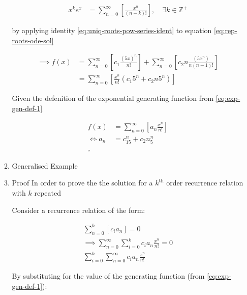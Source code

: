 \documentclass[11pt]{article}
\begin{document}
\begin{enumerate}
\begin{enumerate}
\begin{align}
    x^ke^x &= \sum^{\infty}_{n= 0}   {\left[{ \frac{x^n}{{\left({ n- k }\right)}!} }\right]}, \quad \exists k \in \mathbb{Z}^+ \label{eq:uniq-roots-pow-series-ident}
\end{align}

by applying identity \eqref{eq:uniq-roots-pow-series-ident} to equation \eqref{eq:rep-roots-ode-sol}

\begin{align}
    \implies  f{\left({ x }\right)} &= \sum^{\infty}_{n= 0}   {\left[{ c_1 \frac{{\left({ 5x }\right)}^n}{n!} }\right]}  +  \sum^{\infty}_{n= 0}   {\left[{ c_2 n \frac{{\left({ 5x^n }\right)}}{n{\left({ n-1 }\right)}!} }\right]} \nonumber \\
 &= \sum^{\infty}_{n= 0}   {\left[{ \frac{x^n}{n!} {\left({ c_{1}5^n +  c_2 n 5^n   }\right)} }\right]} \nonumber
\end{align}

Given the defenition of the exponential generating function from \eqref{eq:exp-gen-def-1}

\begin{align}
    f{\left({ x }\right)}&=     \sum^{\infty}_{n= 0}   {\left[{ a_n \frac{x^n}{n!} }\right]} \nonumber \\
    \iff a_n &= c_{15}^n +  c_2n_5^n \nonumber \\ \nonumber
    \ \nonumber \\
    \square \nonumber
\end{align}
\item Generalised Example
\label{sec:org3897bad}

\item Proof
\label{sec:org0b39497}
In order to prove the the solution for a \(k^{\mathrm{th}}\) order recurrence relation with \(k\) repeated


Consider a recurrence relation of the form:

\begin{align}
     \sum^{k}_{n= 0}   {\left[{ c_i a_n }\right]}  = 0 \nonumber \\
      \implies  \sum^{\infty}_{n= 0}   \sum^{k}_{i= 0}   c_i a_n \frac{x^n}{n!} = 0 \nonumber \\
      \sum^{k}_{i= 0}   \sum^{\infty}_{n= 0}   c_i a_n \frac{x^n}{n!} \nonumber
\end{align}

By substituting for the value of the generating function (from \eqref{eq:exp-gen-def-1}):


\end{enumerate}
\end{enumerate}
\end{document}
